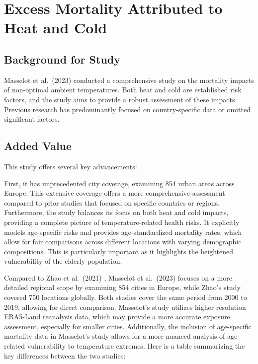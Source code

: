 \documentclass[
]{krantz}
\begin{document}
\section{Excess Mortality Attributed to Heat and Cold}\label{excess-mortality-attributed-to-heat-and-cold}

\subsection{Background for Study}\label{background-for-study}

Masselot et al.~(2023) conducted a comprehensive study on the mortality impacts of non-optimal ambient temperatures. Both heat and cold are established risk factors, and the study aims to provide a robust assessment of these impacts. Previous research has predominantly focused on country-specific data or omitted significant factors.

\subsection{Added Value}\label{added-value}

This study offers several key advancements:

First, it has unprecedented city coverage, examining 854 urban areas across Europe. This extensive coverage offers a more comprehensive assessment compared to prior studies that focused on specific countries or regions. Furthermore, the study balances its focus on both heat and cold impacts, providing a complete picture of temperature-related health risks. It explicitly models age-specific risks and provides age-standardized mortality rates, which allow for fair comparisons across different locations with varying demographic compositions. This is particularly important as it highlights the heightened vulnerability of the elderly population.

Compared to Zhao et al.~(2021) \citep{zhao2021} , Masselot et al.~(2023) focuses on a more detailed regional scope by examining 854 cities in Europe, while Zhao's study covered 750 locations globally. Both studies cover the same period from 2000 to 2019, allowing for direct comparison. Masselot's study utilizes higher resolution ERA5-Land reanalysis data, which may provide a more accurate exposure assessment, especially for smaller cities. Additionally, the inclusion of age-specific mortality data in Masselot's study allows for a more nuanced analysis of age-related vulnerability to temperature extremes. Here is a table summarizing the key differences between the two studies:
\end{document}
